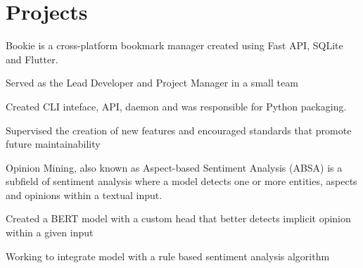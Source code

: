 \documentclass[]{resume-template}
\begin{document}
\begin{minipage}[t]{0.66\textwidth}


    \section{Projects}\label{sec:projects}

    \label{subsec: Bookie}
    \vspace{\topsep}
    \begin{tightemize}
        \item Bookie is a cross-platform bookmark manager created using Fast API, SQLite and Flutter.
        \item Served as the Lead Developer and Project Manager in a small team
        \item Created CLI inteface, API, daemon and was responsible for Python packaging.
        \item Supervised the creation of new features and encouraged standards that promote future maintainability
    \end{tightemize}
    \vspace{\topsep}

    \label{subsec:opinionmining}
    \begin{tightemize}
        \item Opinion Mining, also known as Aspect-based Sentiment Analysis (ABSA) is a subfield of sentiment analysis
        where a model detects one or more entities, aspects and opinions within a textual input.
        \item Created a BERT model with a custom head that better detects implicit opinion within a given input
        \item Working to integrate model with a rule based sentiment analysis algorithm
    \end{tightemize}
    \vspace{\topsep}


\end{minipage}
\end{document}
